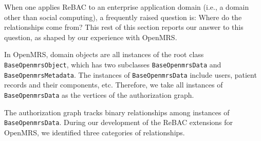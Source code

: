 \documentclass{acm_proc_article-sp}
\newcommand{\textcode}[1]{\texttt{#1}}
\begin{document}
When one applies ReBAC to an enterprise application domain (i.e., a
domain other than social computing), a frequently raised question is:
Where do the relationships come from?  This rest of this section
reports our answer to this question, as shaped by our experience with
OpenMRS.

In OpenMRS, domain objects are all instances
of the root class \textcode{BaseOpenmrsObject},
which has two subclasses \linebreak \textcode{BaseOpenmrsData}
and \textcode{BaseOpenmrsMetadata}.  The instances
of \textcode{BaseOpenmrsData} include users, patient 
records and their components, etc.  Therefore, we
take all instances of \linebreak \textcode{BaseOpenmrsData}
as the vertices of the authorization graph.

The authorization graph tracks binary relationships among instances of
\textcode{BaseOpenmrsData}.  During our development of the ReBAC
extensions for OpenMRS, we identified three categories of
relationships.
\end{document}
